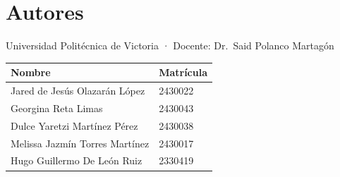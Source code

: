 \documentclass[
  spanish,
  11pt,
]{article}
\newcounter{none} %
\begin{document}
\section{Autores}\label{autores}

Universidad Politécnica de Victoria · Docente: Dr.~Said Polanco Martagón

{\def\LTcaptype{none} %
\begin{longtable}[]{@{}ll@{}}
\toprule\noalign{}
Nombre & Matrícula \\
\midrule\noalign{}
\endhead
\bottomrule\noalign{}
\endlastfoot
Jared de Jesús Olazarán López & 2430022 \\
Georgina Reta Limas & 2430043 \\
Dulce Yaretzi Martínez Pérez & 2430038 \\
Melissa Jazmín Torres Martínez & 2430017 \\
Hugo Guillermo De León Ruiz & 2330419 \\
\end{longtable}
}
\end{document}
